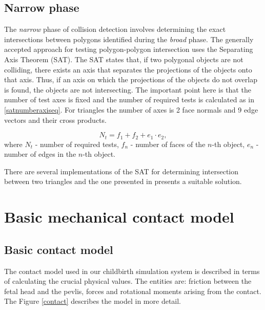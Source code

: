   \subsection{Narrow phase}
  The \emph{narrow} phase of collision detection involves determining the exact intersections between polygons identified during the \emph{broad} phase. The generally accepted approach for testing polygon-polygon intersection uses the Separating Axis Theorem (SAT). The SAT states that, if two polygonal objects are not colliding, there exists an axis that separates the projections of the objects onto that axis. Thus, if an axis on which the projections of the objects do not overlap is found, the objects are not intersecting. The important point here is that the number of test axes is fixed and the number of required tests is calculated as in \ref{satnumberaxiseq}. For triangles the number of axes is 2 face normals and 9 edge vectors and their cross products.

  \begin{equation}\label{satnumberaxiseq}
  N_{t} = f_{1} + f_{2} + e_{1}\cdot e_{2},
  \end{equation}
  where $N_{t}$ - number of required tests, $f_{n}$ - number of faces of the $n$-th object, $e_{n}$ - number of edges in the $n$-th object.

  There are several implementations of the SAT for determining intersection between two triangles and the one presented in \citep{SAT} presents a suitable solution.


\section{Basic mechanical contact model}

\subsection{Basic contact model}

The contact model used in our childbirth simulation system is described in terms of calculating the crucial physical values. The entities are: friction between the fetal head and the pevlis, forces and rotational moments arising from the contact. The Figure \ref{contact} describes the model in more detail.

